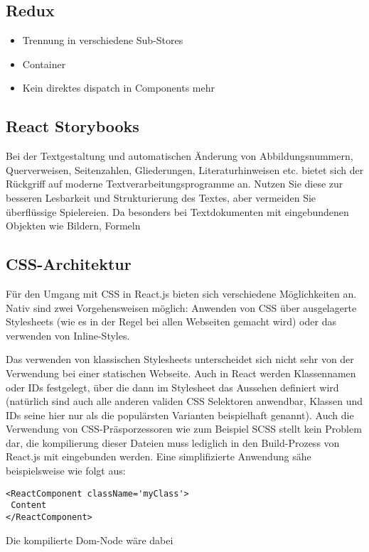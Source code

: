 \subsection{Redux}
\begin{itemize}
  \item Trennung in verschiedene Sub-Stores
  \item Container
  \item Kein direktes dispatch in Components mehr
\end{itemize}

\subsection{React Storybooks}
Bei der Textgestaltung und automatischen Änderung von Abbildungsnummern, Querverweisen,
Seitenzahlen, Gliederungen, Literaturhinweisen etc. bietet sich der Rückgriff
auf moderne Textverarbeitungsprogramme an. Nutzen Sie diese zur besseren Lesbarkeit
und Strukturierung des Textes, aber vermeiden Sie überflüssige Spielereien. Da
besonders bei Textdokumenten mit eingebundenen Objekten wie Bildern, Formeln

\subsection{CSS-Architektur}
Für den Umgang mit CSS in React.js bieten sich verschiedene Möglichkeiten an. Nativ sind zwei Vorgehensweisen möglich: Anwenden von CSS über ausgelagerte Stylesheets (wie es in der Regel bei allen Webseiten gemacht wird) oder das verwenden von Inline-Styles.

Das verwenden von klassischen Stylesheets unterscheidet sich nicht sehr von der Verwendung bei einer statischen Webseite. Auch in React werden Klassennamen oder IDs festgelegt, über die dann im Stylesheet das Aussehen definiert wird (natürlich sind auch alle anderen validen CSS Selektoren anwendbar, Klassen und IDs seine hier nur als die populärsten Varianten beispielhaft genannt).
Auch die Verwendung von CSS-Präsporzessoren wie zum Beispiel SCSS stellt kein Problem dar, die kompilierung dieser Dateien muss lediglich in den Build-Prozess von React.js mit eingebunden werden. Eine simplifizierte Anwendung sähe beispielsweise wie folgt aus:

\begin{lstlisting}
<ReactComponent className='myClass'>
 Content
</ReactComponent>
\end{lstlisting}

Die kompilierte Dom-Node wäre dabei

